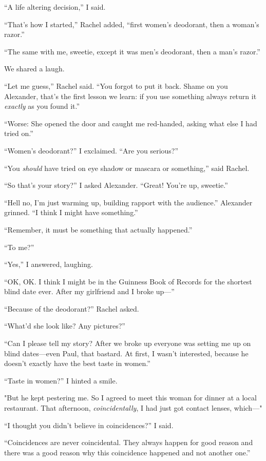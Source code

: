 ``A life altering decision,'' I said.

``That's how I started,'' Rachel added, ``first women's deodorant, then
a woman's razor.''

``The same with me, sweetie, except it was men's deodorant, then a man's
razor.''

We shared a laugh.

``Let me guess,'' Rachel said. ``You forgot to put it back. Shame on you
Alexander, that's the first lesson we learn: if you use something always
return it \emph{exactly} as you found it.''

``Worse: She opened the door and caught me red-handed, asking what else
I had tried on.''

``Women's deodorant?'' I exclaimed. ``Are you serious?''

``You \emph{should} have tried on eye shadow or mascara or something,''
said Rachel.

``So that's your story?'' I asked Alexander. ``Great! You're up,
sweetie.''

``Hell no, I'm just warming up, building rapport with the audience.''
Alexander grinned. ``I think I might have something.''

``Remember, it must be something that actually happened.''

``To me?''

``Yes,'' I answered, laughing.

``OK, OK. I think I might be in the Guinness Book of Records for the
shortest blind date ever. After my girlfriend and I broke up---''

``Because of the deodorant?'' Rachel asked.

``What'd she look like? Any pictures?''

``Can I please tell my story? After we broke up everyone was setting me
up on blind dates---even Paul, that bastard. At first, I wasn't
interested, because he doesn't exactly have the best taste in women.''

``Taste in women?'' I hinted a smile.

"But he kept pestering me. So I agreed to meet this woman for dinner at
a local restaurant. That afternoon, \emph{coincidentally}, I had just
got contact lenses, which---"

``I thought you didn't believe in coincidences?'' I said.

``Coincidences are never coincidental. They always happen for good
reason and there was a good reason why this coincidence happened and not
another one.''

